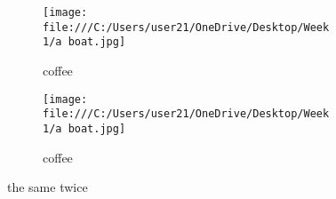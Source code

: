 \documentclass{article}
\begin{document}
	\begin{figure}[h!]
		\centering
		\begin{subfigure}[b]{0.4\linewidth}
			\texttt{[image: file:///C:/Users/user21/OneDrive/Desktop/Week 1/a boat.jpg]}
			\caption{coffee}
			\end{subfigure}
		\begin{subfigure}[b]{0.4\linewidth}
			
			\texttt{[image: file:///C:/Users/user21/OneDrive/Desktop/Week 1/a boat.jpg]}
			\caption{coffee}
		\end{subfigure}
	\caption{the same twice}
	\label{fig:bread}
	\end{figure}
			
\end{document}

